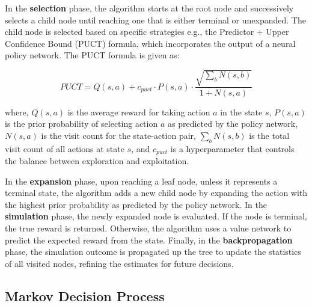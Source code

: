 \documentclass[letterpaper]{article} %
\begin{document}
\noindent In the \textbf{selection} phase, the algorithm starts at the root node and successively selects a child node until reaching one that is either terminal or unexpanded. The child node is selected based on specific strategies e.g., the Predictor + Upper Confidence Bound (PUCT) formula, which incorporates the output of a neural policy network. The PUCT formula is given as:

\[PUCT = Q(s,a) + c_{puct} \cdot P(s,a) \cdot \frac{\sqrt{\sum_b N(s,b)}}{1+N(s,a)} \]

\noindent where, \(Q(s, a)\) is the average reward for taking action \(a\) in the state \(s\), \(P(s, a)\) is the prior probability of selecting action \(a\) as predicted by the policy network, \(N(s, a)\) is the visit count for the state-action pair, \(\sum_{b} N(s, b)\) is the total visit count of all actions at state \(s\), and \(c_{puct}\) is a hyperparameter that controls the balance between exploration and exploitation.  

\noindent In the \textbf{expansion} phase, upon reaching a leaf node, unless it represents a terminal state, the algorithm adds a new child node by expanding the action with the highest prior probability as predicted by the policy network. In the \textbf{simulation} phase, the newly expanded node is evaluated. If the node is terminal, the true reward is returned. Otherwise, the algorithm uses a value network to predict the expected reward from the state. Finally, in the \textbf{backpropagation} phase, the simulation outcome is propagated up the tree to update the statistics of all visited nodes, refining the estimates for future decisions.



	



\subsection{Markov Decision Process}

\end{document}
